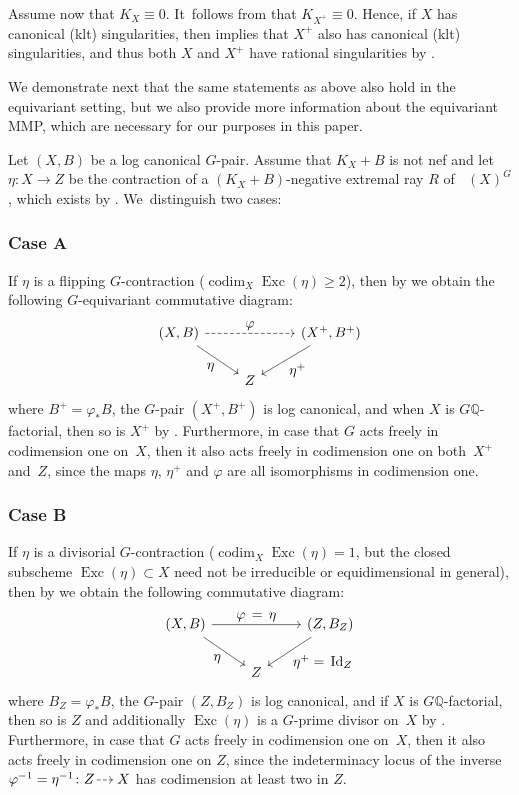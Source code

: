 \documentclass[JEP,XML,SOM,Unicode,published]{cedram}
\let\ts\textstyle
\newcommand{\dradpl}{{\hspace*{-2.5mm}\begin{tikzcd}[ampersand replacement=\&,column sep = scriptsize]\mbox{}\ar[r,dashed]\&\mbox{}\end{tikzcd}\hspace*{-2.5mm}}}
\newcommand{\dratst}{{\hspace*{-2.5mm}\begin{tikzcd}[ampersand replacement=\&,column sep = small]\mbox{}\ar[r,dashed]\&\mbox{}\end{tikzcd}\hspace*{-2mm}}}
\let\drascst\dratst
\newcommand{\dra}{\mathchoice{\dradpl}{\dratst}{\drascst}{\drascst}}
\theoremstyle{plain}
\theoremstyle{definition}
\newcommand{\Q}{\mathbb{Q}}
\DeclareMathOperator{\codim}{codim}
\DeclareMathOperator{\Exc}{Exc}
\DeclareMathOperator{\Id}{Id}
\DeclareMathOperator{\NEb}{\overline{\mathrm{NE}}}
\begin{document}
Assume now that $K_X \equiv 0$. It~follows from \cite[Th.\,4.5.2(4)(iii)]{Fuj17book} that $K_{X^+} \equiv 0$. Hence, if $X$ has canonical (\resp klt) singularities, then \cite[Lem.\,3.38]{KM98} implies that $X^{+}$ also has canonical (\resp klt) singularities, and thus both $X$ and $X^+$ have rational singularities by \cite[Th.\,5.22]{KM98}.

We demonstrate next that the same statements as above also hold in the equivariant setting, but we also provide more information about the equivariant MMP, which are necessary for our purposes in this paper.

Let $(X,B)$ be a log canonical $G$\nobreakdash-pair.
Assume that $K_X+B$ is not nef and let $\eta \colon X \to Z$ be the contraction of a $(K_X+B)$-negative extremal ray $R$ of $\NEb(X)^G$, which exists by \cite[Th.\,3.3.1]{Pro21}. We~distinguish two cases:

\subsubsection*{Case A}
If $\eta$ is a flipping $G$\nobreakdash-contraction (\ie $\codim_X \Exc(\eta) \geq 2$), then by \cite[Th.\,3.4.2 \& Th.\,3.4.3]{Pro21} we obtain the following $G$\nobreakdash-equivariant commutative diagram:
\[
\begin{tikzcd}
(X, B) \arrow[dr, "\ts \eta" swap] \arrow[rr, "\ts \varphi", dashed] && (X^+, B^+) \arrow[dl, "\ts \eta^+"] \\
& Z
\end{tikzcd}
\]
where $B^+ = \varphi_* B$, the $G$\nobreakdash-pair $(X^+, B^+)$ is log canonical, and when $X$ is $G\Q$-factorial, then so is $X^+$ by \cite[Th.\,3.4.2(ii)]{Pro21}. Furthermore, in case that $G$ acts freely in codimension one on~$X$, then it also acts freely in codimension one on both~$X^+$ and~$Z$, since the maps $\eta$, $\eta^+$ and $\varphi$ are all isomorphisms in codimension one.

\subsubsection*{Case B}
If $\eta$ is a divisorial $G$\nobreakdash-contraction (\ie $\codim_X \Exc(\eta) = 1$, but the closed subscheme $\Exc(\eta) \subset X$ need not be irreducible or equidimensional in general), then by \cite[Th.\,3.3.2]{Pro21} we obtain the following commutative diagram:
\[
\begin{tikzcd}
(X, B) \arrow[dr, "\ts \eta" swap] \arrow[rr, "\ts \varphi \,= \,\eta"] && (Z,B_Z) \arrow[dl, "\ts \eta^+ = \,\Id_Z"] \\
& Z
\end{tikzcd}
\]
where $B_Z = \varphi_* B$, the $G$\nobreakdash-pair $(Z,B_Z)$ is log canonical, and if $X$ is $G\Q$-factorial, then so is $Z$ and additionally $\Exc(\eta)$ is a $G$\nobreakdash-prime divisor on~$X$ by \cite[Th.\,3.3.2(ii)]{Pro21}. Furthermore, in case that $G$ acts freely in codimension one on~$X$, then it also acts freely in codimension one on $Z$, since the indeterminacy locus of the inverse $\varphi^{-1} = \eta^{-1} \colon Z \dra X$ has codimension at least two in $Z$.
\end{document}
